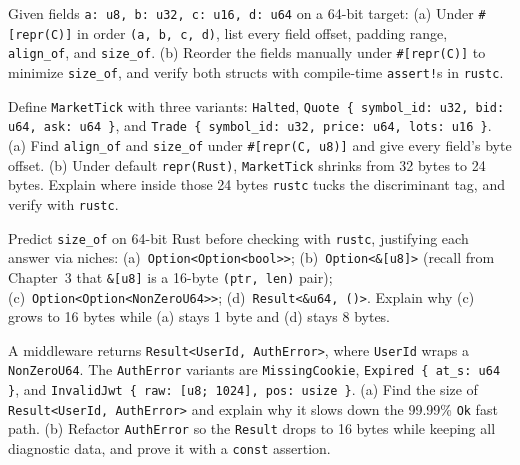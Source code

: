 \begin{exercise}
\label{ch05:ex-struct-padding}
Given fields \texttt{a: u8, b: u32, c: u16, d: u64} on a 64-bit target:
(a) Under \texttt{\#[repr(C)]} in order \texttt{(a, b, c, d)}, list every field offset, padding range, \texttt{align\_of}, and \texttt{size\_of}.
(b) Reorder the fields manually under \texttt{\#[repr(C)]} to minimize \texttt{size\_of}, and verify both structs with compile-time \texttt{assert!}s in \texttt{rustc}.
\end{exercise}

\begin{exercise}
\label{ch05:ex-tagged-union}
Define \texttt{MarketTick} with three variants: \texttt{Halted}, \texttt{Quote \{ symbol\_id: u32, bid: u64, ask: u64 \}}, and \texttt{Trade \{ symbol\_id: u32, price: u64, lots: u16 \}}.
(a) Find \texttt{align\_of} and \texttt{size\_of} under \texttt{\#[repr(C, u8)]} and give every field's byte offset.
(b) Under default \texttt{repr(Rust)}, \texttt{MarketTick} shrinks from 32 bytes to 24 bytes. Explain where inside those 24 bytes \texttt{rustc} tucks the discriminant tag, and verify with \texttt{rustc}.
\end{exercise}

\begin{exercise}
\label{ch05:ex-niches}
Predict \texttt{size\_of} on 64-bit Rust before checking with \texttt{rustc}, justifying each answer via niches:
(a)~\texttt{Option<Option<bool>>};
(b)~\texttt{Option<\&[u8]>} (recall from Chapter~3 that \texttt{\&[u8]} is a 16-byte \texttt{(ptr, len)} pair);
(c)~\texttt{Option<Option<NonZeroU64>>};
(d)~\texttt{Result<\&u64, ()>}.
Explain why (c) grows to 16 bytes while (a) stays 1 byte and (d) stays 8 bytes.
\end{exercise}

\begin{exercise}
\label{ch05:ex-giant-variant}
A middleware returns \texttt{Result<UserId, AuthError>}, where \texttt{UserId} wraps a \texttt{NonZeroU64}. The \texttt{AuthError} variants are \texttt{MissingCookie}, \texttt{Expired \{ at\_s: u64 \}}, and \texttt{InvalidJwt \{ raw: [u8; 1024], pos: usize \}}.
(a) Find the size of \texttt{Result<UserId, AuthError>} and explain why it slows down the 99.99\% \texttt{Ok} fast path.
(b) Refactor \texttt{AuthError} so the \texttt{Result} drops to 16 bytes while keeping all diagnostic data, and prove it with a \texttt{const} assertion.
\end{exercise}

